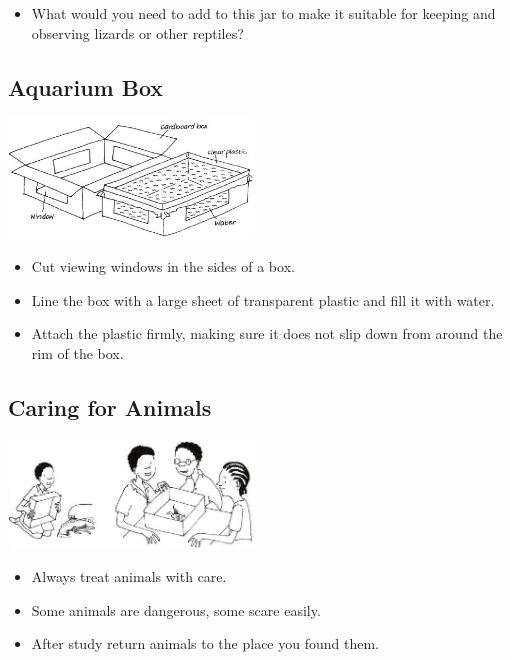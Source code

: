 \begin{multicols}{2}
\begin{itemize}
\item What would you need to add to
this jar to make it suitable for
keeping and observing lizards
or other reptiles?
\end{itemize}

\columnbreak

\subsection{Aquarium Box}

\begin{center}
\includegraphics[width=0.49\textwidth]{./img/vso/aquarium.jpg}
\end{center}

\begin{itemize}
\item Cut viewing windows in the
sides of a box.
\item Line the box with a large sheet
of transparent plastic and fill it
with water.
\item Attach the plastic firmly,
making sure it does not slip
down from around the rim of
the box.
\end{itemize}


\subsection{Caring for Animals}

\begin{center}
\includegraphics[width=0.49\textwidth]{./img/vso/caring-animals.jpg}
\end{center}

\begin{itemize}
\item Always treat animals with care.
\item Some animals are dangerous,
some scare easily.
\item After study return animals to
the place you found them.
\end{itemize}

\end{multicols}







